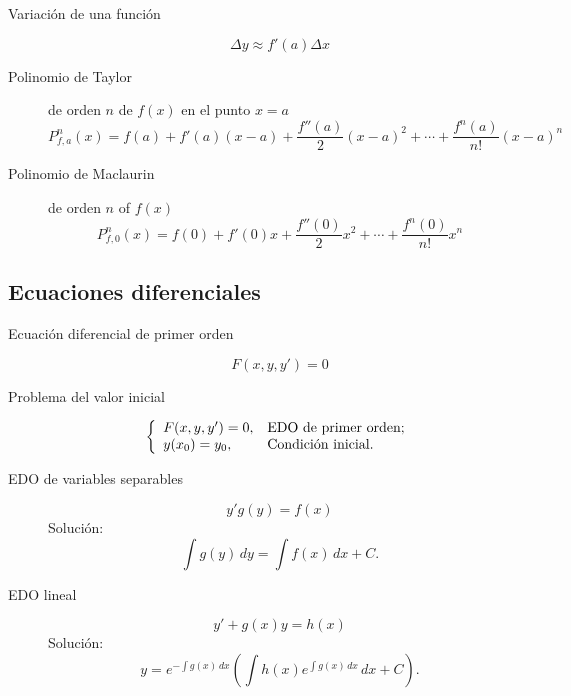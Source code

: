 \begin{multicols}{2}
\begin{tcolorbox}[hbox, title=Aproximación de funciones]
\begin{minipage}{0.4\textwidth}
\flushleft
\begin{description}
\item[Variación de una función]
      \[
      \Delta y\approx f'(a)\Delta x
      \]
\item[Polinomio de Taylor] de orden $n$ de $f(x)$ en el punto $x=a$
      \[
      P^n_{f,a}(x)=f(a)+f'(a)(x-a)+\frac{f''(a)}{2}(x-a)^2+\cdots+\frac{f^n(a)}{n!}(x-a)^n
      \]
\item[Polinomio de Maclaurin] de orden $n$ of $f(x)$
      \[
      P^n_{f,0}(x)=f(0)+f'(0)x+\frac{f''(0)}{2}x^2+\cdots+\frac{f^n(0)}{n!}x^n
      \]
\end{description}
\end{minipage}
\end{tcolorbox}



\subsection*{Ecuaciones diferenciales}

\begin{tcolorbox}[hbox, title=Ecuación diferencial de primer orden]
\begin{minipage}{0.4\textwidth}
\flushleft
\begin{description}
\item[Ecuación diferencial de primer orden]
      \[
      F(x,y,y')=0
      \]
\item[Problema del valor inicial]
      \[
      \left\{
      \begin{array}{ll}
      F(x,y,y')=0, & \hbox{EDO de primer orden;} \\
      y(x_0)=y_0,  & \hbox{Condición inicial.}   \\
      \end{array}
      \right.
      \]
\end{description}
\end{minipage}
\end{tcolorbox}

\begin{tcolorbox}[hbox, title=Resolución de EDO de primer orden]
\begin{minipage}{0.4\textwidth}
\flushleft
\begin{description}
\item[EDO de variables separables]
      \[
      y'g(y)=f(x)
      \]
      Solución:
      \[
      \int g(y)\,dy = \int f(x)\,dx+C.
      \]
\item[EDO lineal]
      \[
      y'+g(x)y = h(x)
      \]
      Solución:
      \[
      y=e^{-\int g(x)\,dx}\left(\int h(x)e^{\int g(x)\,dx}\,dx+C\right).
      \]
\end{description}
\end{minipage}
\end{tcolorbox}




\end{multicols}
